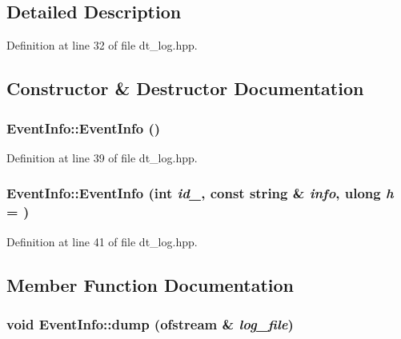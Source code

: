 \subsection{Detailed Description}


Definition at line 32 of file dt\_\-log.hpp.

\subsection{Constructor \& Destructor Documentation}
\hypertarget{struct_event_info_afecb7cc24a3672df223d8b9446211787}{
\subsubsection[{EventInfo}]{\setlength{\rightskip}{0pt plus 5cm}EventInfo::EventInfo ()}}
\label{struct_event_info_afecb7cc24a3672df223d8b9446211787}


Definition at line 39 of file dt\_\-log.hpp.\hypertarget{struct_event_info_ae707af3cd659bc10776ff7bcb0b1f537}{
\subsubsection[{EventInfo}]{\setlength{\rightskip}{0pt plus 5cm}EventInfo::EventInfo (int {\em id\_\-}, \/  const string \& {\em info}, \/  {\bf ulong} {\em h} = {})}}
\label{struct_event_info_ae707af3cd659bc10776ff7bcb0b1f537}


Definition at line 41 of file dt\_\-log.hpp.

\subsection{Member Function Documentation}
\hypertarget{struct_event_info_a3e4a489eec9f1f7bf9cc9d9fc6c6d8de}{
\subsubsection[{dump}]{\setlength{\rightskip}{0pt plus 5cm}void EventInfo::dump (ofstream \& {\em log\_\-file})}}
\label{struct_event_info_a3e4a489eec9f1f7bf9cc9d9fc6c6d8de}


